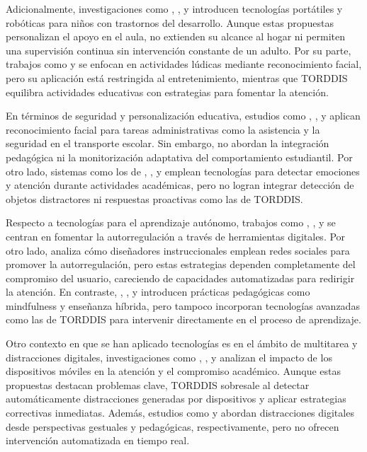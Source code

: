 \documentclass[a4paper,fleqn]{cas-sc}
\begin{document}
				Adicionalmente, investigaciones como \cite{Berrezueta-Guzman2021}, \cite{VilliersRader2021}, y \cite{Washington2016AWereable} introducen tecnologías portátiles y robóticas para niños con trastornos del desarrollo. Aunque estas propuestas personalizan el apoyo en el aula, no extienden su alcance al hogar ni permiten una supervisión continua sin intervención constante de un adulto. Por su parte, trabajos como \cite{Muller2018ArchnSmile} y \cite{Nguyen2019} se enfocan en actividades lúdicas mediante reconocimiento facial, pero su aplicación está restringida al entretenimiento, mientras que TORDDIS equilibra actividades educativas con estrategias para fomentar la atención.
				
				En términos de seguridad y personalización educativa, estudios como \cite{Hachad2020}, \cite{James2019}, y \cite{Boumiza2017} aplican reconocimiento facial para tareas administrativas como la asistencia y la seguridad en el transporte escolar. Sin embargo, no abordan la integración pedagógica ni la monitorización adaptativa del comportamiento estudiantil. Por otro lado, sistemas como los de \cite{DaCosta2023}, \cite{Kumar2024Zoom}, y \cite{Narkhede2023} emplean tecnologías para detectar emociones y atención durante actividades académicas, pero no logran integrar detección de objetos distractores ni respuestas proactivas como las de TORDDIS.
				
				Respecto a tecnologías para el aprendizaje autónomo, trabajos como \cite{Bembich2016Future}, \cite{Roberts2020Task}, y \cite{Peters2003Self} se centran en fomentar la autorregulación a través de herramientas digitales. Por otro lado, \cite{Muljana2022Instructional} analiza cómo diseñadores instruccionales emplean redes sociales para promover la autorregulación, pero estas estrategias dependen completamente del compromiso del usuario, careciendo de capacidades automatizadas para redirigir la atención. En contraste, \cite{Palmer2022impact}, \cite{Adcroft2018Developing}, y \cite{Salter2014Exploring} introducen prácticas pedagógicas como mindfulness y enseñanza híbrida, pero tampoco incorporan tecnologías avanzadas como las de TORDDIS para intervenir directamente en el proceso de aprendizaje.
				
				Otro contexto en que se han aplicado tecnologías es en el ámbito de multitarea y distracciones digitales, investigaciones como \cite{Hartley2022Smartphone}, \cite{Labar2019Interplay}, y \cite{Farsani2020} analizan el impacto de los dispositivos móviles en la atención y el compromiso académico. Aunque estas propuestas destacan problemas clave, TORDDIS sobresale al detectar automáticamente distracciones generadas por dispositivos y aplicar estrategias correctivas inmediatas. Además, estudios como \cite{Erazo2016Easing} y \cite{Wang2022Empowering} abordan distracciones digitales desde perspectivas gestuales y pedagógicas, respectivamente, pero no ofrecen intervención automatizada en tiempo real.
				
\end{document}
